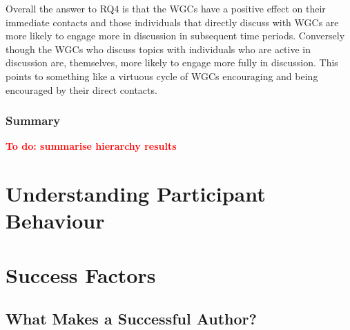 \documentclass[twocolumn,10pt]{article}
\newcommand{\todo}[1]{\textbf{\textcolor{red}{To do: #1}}}
\begin{document}
Overall the answer to RQ4 is that the WGCs have a positive effect on their
immediate contacts and those individuals that directly discuss with WGCs
are more likely to engage more in discussion in subsequent time periods.
Conversely though the WGCs who discuss topics with individuals who are
active in discussion are, themselves, more likely to engage more fully in
discussion. This points to something like a virtuous cycle of WGCs
encouraging and being encouraged by their direct contacts. 

\subsubsection{Summary}


\todo{summarise hierarchy results}

\section{Understanding Participant Behaviour}
\label{sec:behaviour}






\section{Success Factors}
\label{sec:success-factors}

\subsection{What Makes a Successful Author?}
\end{document}
